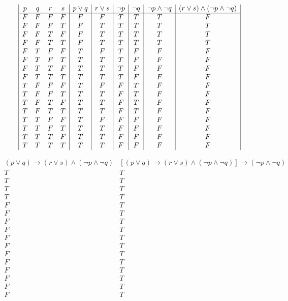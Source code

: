 \documentclass[11pt,a4paper]{article}
\begin{document}
\begin{enumerate}
\begin{center}
\end{center}


\begin{displaymath}
\begin{array}{|c c c c|c|c|c|c|c|c|}
p & q & r & s & p \vee q & r \vee s & \neg p & \neg q & \neg p \wedge \neg q & (r \vee s) \wedge (\neg p \wedge \neg q) \\
\hline 
F & F & F & F & F & F & T & T & T & F\\
F & F & F & T & F & T & T & T & T & T\\
F & F & T & F & F & T & T & T & T & T\\
F & F & T & T & F & T & T & T & T & T\\
F & T & F & F & T & F & T & F & F & F\\
F & T & F & T & T & T & T & F & F & F\\
F & T & T & F & T & T & T & F & F & F\\
F & T & T & T & T & T & T & F & F & F\\
T & F & F & F & T & F & F & T & F & F\\
T & F & F & T & T & T & F & T & F & F\\
T & F & T & F & T & T & F & T & F & F\\
T & F & T & T & T & T & F & T & F & F\\
T & T & F & F & T & F & F & F & F & F\\
T & T & F & T & T & T & F & F & F & F\\
T & T & T & F & T & T & F & F & F & F\\
T & T & T & T & T & T & F & F & F & F\\
\end{array}
\end{displaymath}


\begin{displaymath}
\begin{array}{|c|c|}
(p \vee q) \rightarrow (r \vee s) \wedge (\neg p \wedge \neg q) & [(p \vee q) \rightarrow (r \vee s) \wedge (\neg p \wedge \neg q)] \rightarrow (\neg p \wedge \neg q)\\
\hline 
T & T\\
T & T\\
T & T\\
T & T\\
F & T\\
F & T\\
F & T\\
F & T\\
F & T\\
F & T\\
F & T\\
F & T\\
F & T\\
F & T\\
F & T\\
F & T\\


\end{array}
\end{displaymath}
\end{enumerate}
\end{document}
